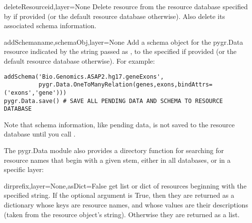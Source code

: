 \documentclass{howto}
\begin{document}
\begin{funcdesc}{deleteResource}{id,layer=None}
  Delete resource  from the resource database specified by
   if provided (or the default resource database otherwise).
  Also delete its associated schema information.
\end{funcdesc}

\begin{funcdesc}{addSchema}{name,schemaObj,layer=None}
  Add a schema object for the pygr.Data resource indicated by the
  string passed as , to the specified  if provided
  (or the default resource database otherwise).  For example:
\begin{verbatim}
addSchema('Bio.Genomics.ASAP2.hg17.geneExons',
          pygr.Data.OneToManyRelation(genes,exons,bindAttrs=('exons','gene')))
pygr.Data.save() # SAVE ALL PENDING DATA AND SCHEMA TO RESOURCE DATABASE
\end{verbatim}
\end{funcdesc}
Note that schema information, like pending data, is not saved to 
the resource database until you call .

The pygr.Data module also provides a directory function for searching
for resource names that begin with a given stem, either in all
databases, or in a specific layer:
\begin{funcdesc}{dir}{prefix,layer=None,asDict=False}
  get list or dict of resources beginning with the specified string.
  If the optional  argument is True, then they are returned
  as a dictionary whose keys are resource names, and whose values are their
  descriptions (taken from the resource object's  string).
  Otherwise they are returned as a list.
\end{funcdesc}
\end{document}
